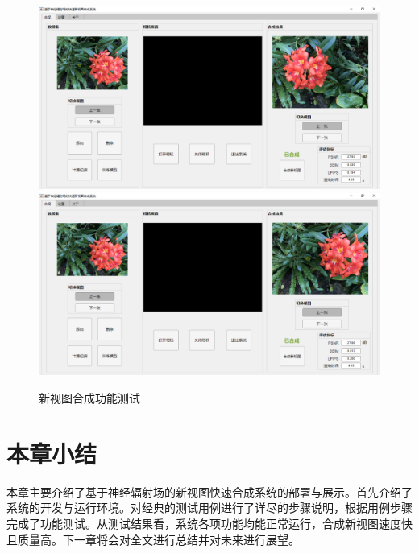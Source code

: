 \begin{figure}[bhtp]
  \subcaptionbox{\label{fig:viewsynthesis-g}}
    {\includegraphics[width=0.45\linewidth]{figures/system/3-g.png}}
    \subcaptionbox{\label{fig:viewsynthesis-h}}
    {\includegraphics[width=0.45\linewidth]{figures/system/3-h.png}}
  \caption{新视图合成功能测试}
  \label{fig:viewsynthesis}
\end{figure}
\newpage
\section{本章小结}
本章主要介绍了基于神经辐射场的新视图快速合成系统的部署与展示。首先介绍了系统的开发与运行环境。对经典的测试用例进行了详尽的步骤说明，根据用例步骤完成了功能测试。从测试结果看，系统各项功能均能正常运行，合成新视图速度快且质量高。下一章将会对全文进行总结并对未来进行展望。







